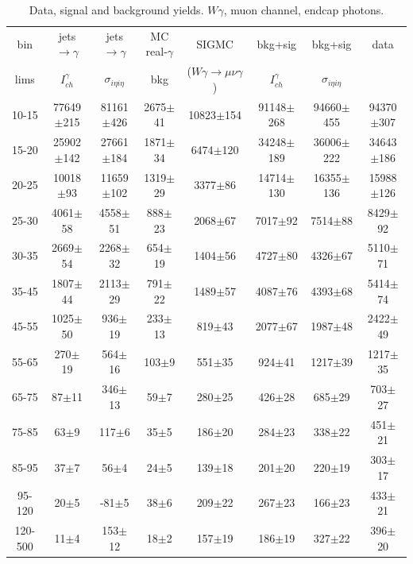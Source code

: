 \begin{table}[h]
  \tiny
  \begin{center}
  \caption{Data, signal and background yields. $W\gamma$, muon channel, endcap photons.}
  \begin{tabular}{|c|c|c|c|c|c|c|c|}
    bin & jets$\rightarrow\gamma$ & jets$\rightarrow\gamma$ & MC real-$\gamma$ & SIGMC & bkg+sig &  bkg+sig & data \\ 
    lims & $I_{ch}^{\gamma}$ & $\sigma_{i\eta i\eta}$ & bkg & ($W\gamma\rightarrow\mu\nu\gamma$) & $I_{ch}^{\gamma}$ &  $\sigma_{i\eta i\eta}$ &\\ \hline
10-15 & 77649$\pm$215 & 81161$\pm$426 & 2675$\pm$41 & 10823$\pm$154 & 91148$\pm$268 & 94660$\pm$455 & 94370$\pm$307 \\ \hline 
15-20 & 25902$\pm$142 & 27661$\pm$184 & 1871$\pm$34 & 6474$\pm$120 & 34248$\pm$189 & 36006$\pm$222 & 34643$\pm$186 \\ \hline 
20-25 & 10018$\pm$93 & 11659$\pm$102 & 1319$\pm$29 & 3377$\pm$86 & 14714$\pm$130 & 16355$\pm$136 & 15988$\pm$126 \\ \hline 
25-30 & 4061$\pm$58 & 4558$\pm$51 & 888$\pm$23 & 2068$\pm$67 & 7017$\pm$92 & 7514$\pm$88 & 8429$\pm$92 \\ \hline 
30-35 & 2669$\pm$54 & 2268$\pm$32 & 654$\pm$19 & 1404$\pm$56 & 4727$\pm$80 & 4326$\pm$67 & 5110$\pm$71 \\ \hline 
35-45 & 1807$\pm$44 & 2113$\pm$29 & 791$\pm$22 & 1489$\pm$57 & 4087$\pm$76 & 4393$\pm$68 & 5414$\pm$74 \\ \hline 
45-55 & 1025$\pm$50 & 936$\pm$19 & 233$\pm$13 & 819$\pm$43 & 2077$\pm$67 & 1987$\pm$48 & 2422$\pm$49 \\ \hline 
55-65 & 270$\pm$19 & 564$\pm$16 & 103$\pm$9 & 551$\pm$35 & 924$\pm$41 & 1217$\pm$39 & 1217$\pm$35 \\ \hline 
65-75 & 87$\pm$11 & 346$\pm$13 & 59$\pm$7 & 280$\pm$25 & 426$\pm$28 & 685$\pm$29 & 703$\pm$27 \\ \hline 
75-85 & 63$\pm$9 & 117$\pm$6 & 35$\pm$5 & 186$\pm$20 & 284$\pm$23 & 338$\pm$22 & 451$\pm$21 \\ \hline 
85-95 & 37$\pm$7 & 56$\pm$4 & 24$\pm$5 & 139$\pm$18 & 201$\pm$20 & 220$\pm$19 & 303$\pm$17 \\ \hline 
95-120 & 20$\pm$5 & -81$\pm$5 & 38$\pm$6 & 209$\pm$22 & 267$\pm$23 & 166$\pm$23 & 433$\pm$21 \\ \hline 
120-500 & 11$\pm$4 & 153$\pm$12 & 18$\pm$2 & 157$\pm$19 & 186$\pm$19 & 327$\pm$22 & 396$\pm$20 \\ \hline 
  \end{tabular}
  \label{tab:yields_Wg_to_munu__Endcap_}
  \end{center}
\end{table}

